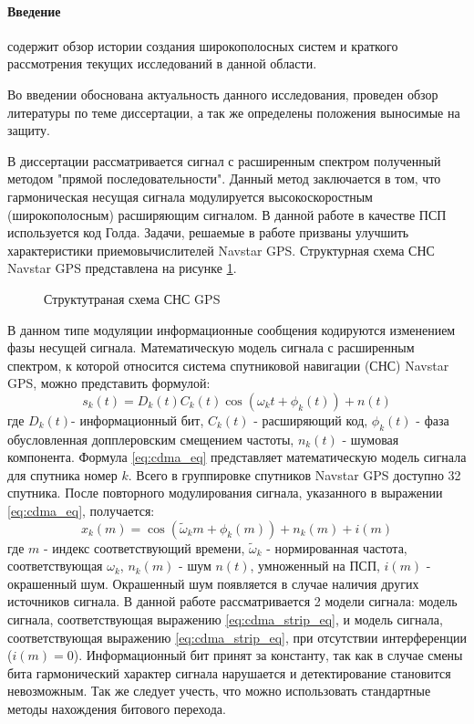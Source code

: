 \paragraph{Введение} содержит обзор истории создания широкополосных систем и краткого рассмотрения текущих исследований в данной области.

Во введении обоснована актуальность данного исследования, проведен обзор литературы по теме диссертации, а так же
определены положения выносимые на защиту.

В диссертации рассматривается сигнал с расширенным спектром полученный методом "прямой последовательности".
Данный метод заключается в том, что гармоническая несущая сигнала модулируется высокоскоростным (широкополосным)
расширяющим сигналом. В данной работе в качестве ПСП используется код Голда. Задачи, решаемые в работе призваны
улучшить характеристики приемовычислителей Navstar GPS. Структурная схема СНС Navstar GPS представлена на рисунке
\ref{pic:sec1_gnss_system}.

\begin{figure}[H]
	\center{}
	\caption{Структутраная схема СНС GPS}
	\label{pic:sec1_gnss_system}
\end{figure}

В данном типе модуляции информационные сообщения кодируются изменением фазы несущей сигнала.
Математическую модель сигнала с расширенным спектром, к которой относится система спутниковой навигации (СНС) Navstar GPS, можно представить формулой:
\begin{equation}
	\label{eq:cdma_eq}
	s_k(t)=D_k(t)C_k(t)\cos{(\omega_{k}t + \phi_k(t))} + n(t)
\end{equation}
где ${D_k}(t)$- информационный бит, ${C_k}(t)$ - расширяющий код, ${\phi_k(t)}$ - фаза обусловленная допплеровским смещением частоты, 
${n_k(t)}$ - шумовая компонента. Формула  \ref{eq:cdma_eq} представляет математическую модель сигнала для спутника номер ${k}$.
Всего в группировке спутников Navstar GPS доступно 32 спутника. После повторного модулирования сигнала, указанного в выражении \ref{eq:cdma_eq},
получается:
\begin{equation}
	\label{eq:cdma_strip_eq}
	x_k(m)=\cos{(\tilde{\omega}_{k}m + \phi_k(m))} + n_k(m) + i(m)
\end{equation}
где ${m}$ - индекс соответствующий времени, ${\tilde{\omega}_k}$ - нормированная частота, соответствующая ${\omega_k}$, ${n_k}(m)$ - шум ${n(t)}$, умноженный на ПСП,
${i(m)}$ - окрашенный шум. Окрашенный шум появляется в случае наличия других источников сигнала.
В данной работе рассматривается 2 модели сигнала: модель сигнала, соответствующая выражению \ref{eq:cdma_strip_eq}, и модель сигнала,
соответствующая выражению \ref{eq:cdma_strip_eq}, при отсутствии интерференции (${i(m)=0}$).
Информационный бит принят за константу, так как в случае смены бита гармонический характер сигнала нарушается и детектирование становится невозможным.
Так же следует учесть, что можно использовать стандартные методы нахождения битового перехода.

